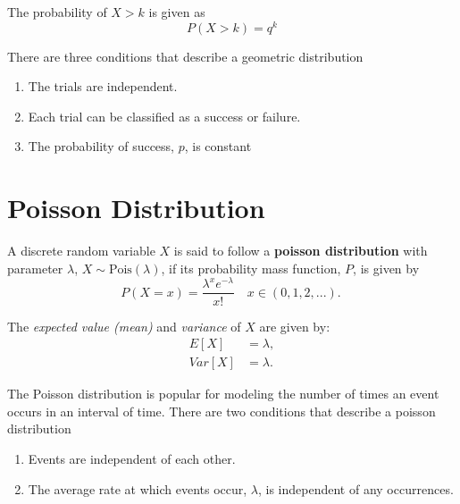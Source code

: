 \begin{note} \label{mod2:eq:Geometric:Prop}
	The probability of $X>k$ is given as
	\begin{equation}
		P(X>k)=q^k
	\end{equation}
\end{note}
\begin{note} \label{mod2:note:Geometric:Conditions}
	There are three conditions that describe a geometric distribution
	\begin{enumerate}[label = (\roman*)]
		\item The trials are independent.
		\item Each trial can be classified as a success or failure.
		\item The probability of success, $p$, is constant
	\end{enumerate}
\end{note}



\section{Poisson Distribution}\label{mod2:section:Poisson}
\begin{defn} \label{mod2:defn:Poisson}
	A discrete random variable $X$ is said to follow a \textbf{poisson distribution} with parameter $\lambda$, $X \sim \text{Pois}(\lambda)$, if its probability mass function, $P$, is given by
\begin{equation}
P(X = x) =\frac{ \lambda ^ x e^{-\lambda}}{x!} \quad x \in (0, 1, 2, ...). \label{mod2:eq:PoissonDist} \ 
\end{equation} 
\end{defn}


\begin{note}
	The \textit{expected value (mean)} and \textit{variance} of $X$ are given by:
	\begin{align}
	E[X] &= \lambda,  \label{mod2:eq:Poisson:Mean} \\ 
	Var[X] &= \lambda. \label{mod2:eq:Poisson:Variance} 
	\end{align}
\end{note}


\begin{note} \label{mod2:note:Poisson:Conditions}
	The Poisson distribution is popular for modeling the number of times an event occurs in an interval of time. There are two conditions that describe a poisson distribution
	\begin{enumerate}[label = (\roman*)]
		\item Events are independent of each other.
		\item The average rate at which events occur, $\lambda$, is independent of any occurrences.
	\end{enumerate}
\end{note}


